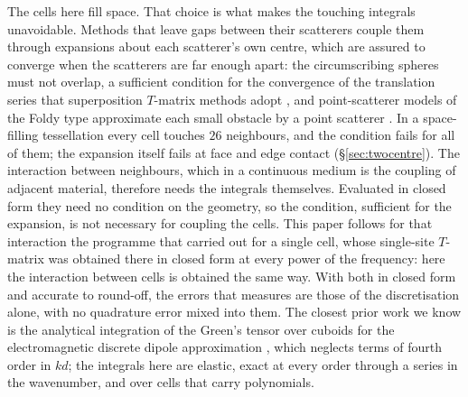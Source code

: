 \documentclass[11pt,a4paper]{article}
\begin{document}
The cells here fill space. That choice is what makes the touching integrals unavoidable. Methods that
leave gaps between their scatterers couple them through expansions about each scatterer's own centre,
which are assured to converge when the scatterers are far enough apart: the circumscribing spheres must
not overlap, a sufficient condition for the convergence of the translation series
\citep{GumerovDuraiswami2004} that superposition $T$-matrix methods adopt \citep{MishchenkoTravisLacis2002}, and
point-scatterer models of the Foldy type approximate each small obstacle by a point scatterer
\citep{Foldy1945,BendaliCocquetTordeux2016}. In a space-filling tessellation every cell touches $26$
neighbours, and the condition fails for all of them; the expansion itself fails at face and edge contact
(\S\ref{sec:twocentre}). The interaction between neighbours, which in a continuous medium is the coupling of
adjacent material, therefore needs the integrals themselves. Evaluated in closed form they need no
condition on the geometry, so the condition, sufficient for the expansion, is not necessary for coupling
the cells. This paper follows for that interaction the programme that \citet{NestorLegendre2026} carried
out for a single cell, whose single-site $T$-matrix was obtained there in closed form at every power of the
frequency: here the interaction between cells is obtained the same way. With both in closed form and
accurate to round-off, the errors that \citet{NestorError2026} measures are those of the discretisation
alone, with no quadrature error mixed into them. The closest prior work we know is the
analytical integration of the Green's tensor over cuboids for the electromagnetic discrete dipole
approximation \citep{YurkinSmunev2023}, which neglects terms of fourth order in $kd$; the integrals here
are elastic, exact at every order through a series in the wavenumber, and over cells that carry
polynomials.
\end{document}
